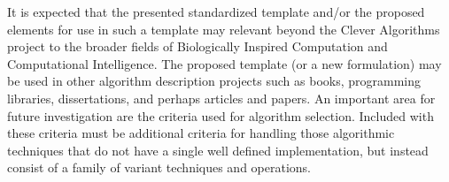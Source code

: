 \documentclass[a4paper, 11pt]{article}
\begin{document}
It is expected that the presented standardized template and/or the proposed elements for use in such a template may relevant beyond the Clever Algorithms project to the broader fields of Biologically Inspired Computation and Computational Intelligence. The proposed template (or a new formulation) may be used in other algorithm description projects such as books, programming libraries, dissertations, and perhaps articles and papers.
An important area for future investigation are the criteria used for algorithm selection. Included with these criteria must be additional criteria for handling those algorithmic techniques that do not have a single well defined implementation, but instead consist of a family of variant techniques and operations.



\end{document}
